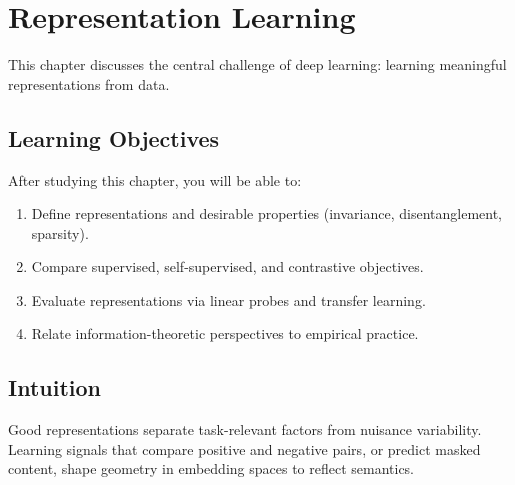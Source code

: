 
\chapter{Representation Learning}
\label{chap:representation-learning}

This chapter discusses the central challenge of deep learning: learning meaningful representations from data.


\section*{Learning Objectives}

After studying this chapter, you will be able to:

\begin{enumerate}
    \item Define representations and desirable properties (invariance, disentanglement, sparsity).
    \item Compare supervised, self-supervised, and contrastive objectives.
    \item Evaluate representations via linear probes and transfer learning.
    \item Relate information-theoretic perspectives to empirical practice.
\end{enumerate}


\section*{Intuition}

Good representations separate task-relevant factors from nuisance variability. Learning signals that compare positive and negative pairs, or predict masked content, shape geometry in embedding spaces to reflect semantics.











